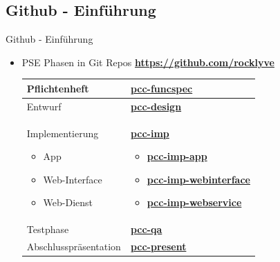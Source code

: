 \documentclass[19pt]{beamer}
\begin{document}
\subsection{Github - Einf\"{u}hrung}
\begin{frame}{Github - Einf\"{u}hrung}
\begin{itemize}
\item PSE Phasen in Git Repos \textbf{\href{https://github.com/rocklyve}{https://github.com/rocklyve}} \\

    	\begin{tabular}{| p{} | p{} |}
  			\hline			
  			Pflichtenheft & \textbf{\href{https://github.com/rocklyve/pcc-funcspec}{pcc-funcspec}}\\
  			\hline			
  			Entwurf & \textbf{\href{https://github.com/rocklyve/pcc-design}{pcc-design}}\\
  			\hline			
  			Implementierung 
  			\begin{itemize}
				\item App
				\item Web-Interface
				\item Web-Dienst
			\end{itemize} & \textbf{\href{https://github.com/rocklyve/pcc-imp}{pcc-imp}} \begin{itemize}
				\item \textbf{\href{https://github.com/rocklyve/pcc-imp-app}{pcc-imp-app}}
				\item \textbf{\href{https://github.com/rocklyve/pcc-imp-webinterface}{pcc-imp-webinterface}}
				\item \textbf{\href{https://github.com/rocklyve/pcc-imp-webservice}{pcc-imp-webservice}}
			\end{itemize}\\
  			\hline
  			Testphase & \textbf{\href{https://github.com/rocklyve/pcc-qa}{pcc-qa}}\\
  			\hline
  			Abschlusspr\"{a}sentation & \textbf{\href{https://github.com/rocklyve/pcc-present}{pcc-present}}\\
		  	\hline  
		\end{tabular}
	\end{itemize}
\end{frame}

\end{document}
